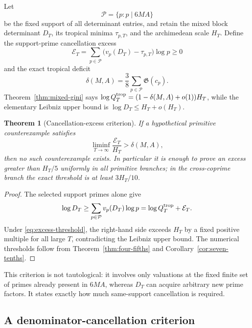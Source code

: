 \documentclass[11pt,oneside]{article}
\newtheorem{theorem}{Theorem}[section]
\theoremstyle{definition}
\theoremstyle{remark}
\begin{document}
Let
\[
 \mathcal P=\{p:p\mid6MA\}
\]
be the fixed support of all determinant entries, and retain the mixed block determinant $D_T$,
its tropical minima $\tau_{p,T}$, and the archimedean scale $H_T$.  Define the support-prime
cancellation excess
\begin{equation}\label{eq:cancellation-excess}
 \mathcal E_T
 =\sum_{p\in\mathcal P}
   \bigl(v_p(D_T)-\tau_{p,T}\bigr)\log p
 \ge0
\end{equation}
and the exact tropical deficit
\begin{equation}\label{eq:tropical-deficit}
 \delta(M,A)=\frac38\sum_{p\in\mathcal P}\mathfrak G(c_p).
\end{equation}
Theorem~\ref{thm:mixed-gini} says
$\log Q_T^{\rm trop}=(1-\delta(M,A)+o(1))H_T$, while the elementary Leibniz upper bound is
$\log D_T\le H_T+o(H_T)$.

\begin{theorem}[Cancellation-excess criterion]\label{thm:excess-criterion}
If a hypothetical primitive counterexample satisfies
\begin{equation}\label{eq:excess-threshold}
 \liminf_{T\to\infty}\frac{\mathcal E_T}{H_T}
 >\delta(M,A),
\end{equation}
then no such counterexample exists.  In particular it is enough to prove an excess greater
than $H_T/5$ uniformly in all primitive branches; in the cross-coprime branch the exact
threshold is at least $3H_T/10$.
\end{theorem}

\begin{proof}
The selected support primes alone give
\[
 \log D_T
 \ge\sum_{p\in\mathcal P}v_p(D_T)\log p
 =\log Q_T^{\rm trop}+\mathcal E_T.
\]
Under \eqref{eq:excess-threshold}, the right-hand side exceeds $H_T$ by a fixed positive
multiple for all large $T$, contradicting the Leibniz upper bound.  The numerical thresholds
follow from Theorem~\ref{thm:four-fifths} and Corollary~\ref{cor:seven-tenths}.
\end{proof}

This criterion is not tautological: it involves only valuations at the fixed finite set of
primes already present in $6MA$, whereas $D_T$ can acquire arbitrary new prime factors.  It
states exactly how much same-support cancellation is required.

\subsection{A denominator-cancellation criterion}
\end{document}
